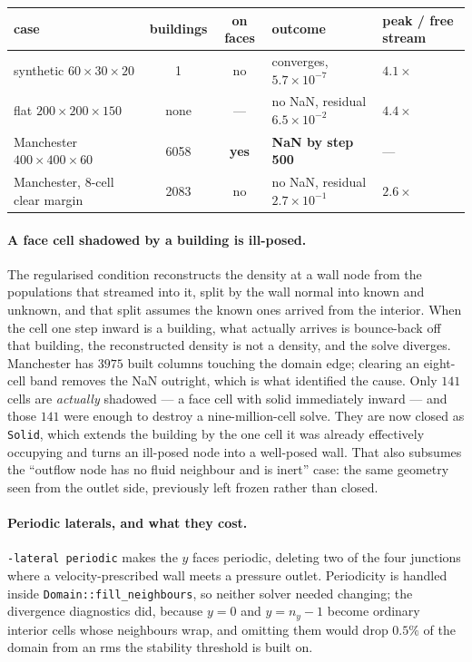 \documentclass[11pt,a4paper]{article}
\begin{document}
\begin{center}\small
\begin{tabular}{lccll}
\toprule
case & buildings & on faces & outcome & peak / free stream \\
\midrule
synthetic $60\times30\times20$   & 1    & no  & converges, $5.7\times10^{-7}$    & $4.1\times$ \\
flat $200\times200\times150$     & none & --- & no NaN, residual $6.5\times10^{-2}$ & $4.4\times$ \\
Manchester $400\times400\times60$ & 6058 & \textbf{yes} & \textbf{NaN by step 500} & --- \\
Manchester, 8-cell clear margin  & 2083 & no  & no NaN, residual $2.7\times10^{-1}$ & $2.6\times$ \\
\bottomrule
\end{tabular}
\end{center}

\paragraph{A face cell shadowed by a building is ill-posed.} The regularised
condition reconstructs the density at a wall node from the populations that
streamed into it, split by the wall normal into known and unknown, and that
split assumes the known ones arrived from the interior. When the cell one step
inward is a building, what actually arrives is bounce-back off that building,
the reconstructed density is not a density, and the solve diverges. Manchester
has $3975$ built columns touching the domain edge; clearing an eight-cell band
removes the NaN outright, which is what identified the cause. Only $141$ cells
are \emph{actually} shadowed --- a face cell with solid immediately inward ---
and those $141$ were enough to destroy a nine-million-cell solve. They are now
closed as \texttt{Solid}, which extends the building by the one cell it was
already effectively occupying and turns an ill-posed node into a well-posed
wall. That also subsumes the ``outflow node has no fluid neighbour and is
inert'' case: the same geometry seen from the outlet side, previously left
frozen rather than closed.

\paragraph{Periodic laterals, and what they cost.} \texttt{-lateral periodic}
makes the $y$ faces periodic, deleting two of the four junctions where a
velocity-prescribed wall meets a pressure outlet. Periodicity is handled inside
\texttt{Domain::fill\_neighbours}, so neither solver needed changing; the
divergence diagnostics did, because $y=0$ and $y=n_y-1$ become ordinary
interior cells whose neighbours wrap, and omitting them would drop $0.5\%$ of
the domain from an rms the stability threshold is built on.
\end{document}
